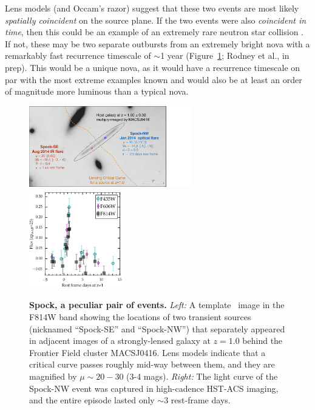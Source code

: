 \documentclass[12pt]{article}
\begin{document}
Lens models (and Occam's razor) suggest that these two events are most
likely {\it spatially coincident} on the source plane.  If the two
events were also {\it coincident in time}, then this could be an
example of an extremely rare neutron star collision \citep[a
  ``kilonova'';][]{Tanvir:2013,Kasen:2014,Metzger:2015}.  If not,
these may be two separate outbursts from an extremely bright nova with
a remarkably fast recurrence timescale of $\sim$1 year
(Figure~\ref{fig:spock}; Rodney et al., in prep).  This would be a
unique nova, as it would have a recurrence timescale on par with the
most extreme examples known \citep{Tang:2014} and would also be at
least an order of magnitude more luminous than a typical nova.

\begin{figure}
\begin{center}
\includegraphics[width=0.63\textwidth]{FIG/spock_summary}
\includegraphics[width=0.36\textwidth]{FIG/spockNW_lightcurve_jan14event2}
\caption{ \label{fig:spock} %
{\bf Spock, a peculiar pair of events.}  {\it Left:} A template
\HST\ image in the F814W band showing the locations of two transient
sources (nicknamed ``Spock-SE'' and ``Spock-NW'') that separately
appeared in adjacent images of a strongly-lensed galaxy at $z=1.0$
behind the Frontier Field cluster MACSJ0416. Lens models indicate that
a critical curve passes roughly mid-way between them, and they are
magnified by $\mu\sim20-30$ (3-4 mags).  {\it Right:} The light curve
of the Spock-NW event was captured in high-cadence HST-ACS imaging,
and the entire episode lasted only $\sim3$ rest-frame days. 
}
\end{center}
\end{figure}
\end{document}
